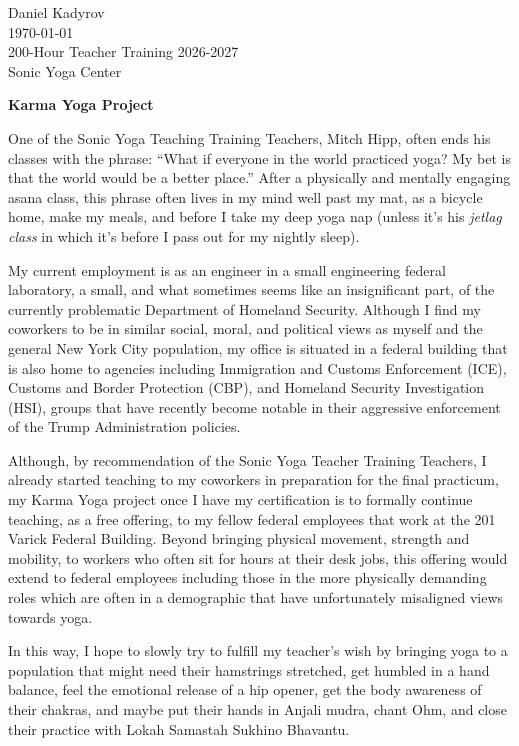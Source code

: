 \documentclass[11pt]{article}
\begin{document}
 
\noindent
Daniel Kadyrov\\
\today\\
200-Hour Teacher Training 2026-2027\\
Sonic Yoga Center
 
\vspace{1em}
 
\begin{center}
  \textbf{Karma Yoga Project}
\end{center}
 
One of the Sonic Yoga Teaching Training Teachers, Mitch Hipp, often ends his classes with the phrase: ``What if everyone in the world practiced yoga? My bet is that the world would be a better place.'' After a physically and mentally engaging asana class, this phrase often lives in my mind well past my mat, as a bicycle home, make my meals, and before I take my deep yoga nap (unless it's his \textit{jetlag class} in which it's before I pass out for my nightly sleep). 

My current employment is as an engineer in a small engineering federal laboratory, a small, and what sometimes seems like an insignificant part, of the currently problematic Department of Homeland Security. Although I find my coworkers to be in similar social, moral, and political views as myself and the general New York City population, my office is situated in a federal building that is also home to agencies including Immigration and Customs Enforcement (ICE), Customs and Border Protection (CBP), and Homeland Security Investigation (HSI), groups that have recently become notable in their aggressive enforcement of the Trump Administration policies. 

Although, by recommendation of the Sonic Yoga Teacher Training Teachers, I already started teaching to my coworkers in preparation for the final practicum, my Karma Yoga project once I have my certification is to formally continue teaching, as a free offering, to my fellow federal employees that work at the 201 Varick Federal Building. Beyond bringing physical movement, strength and mobility, to workers who often sit for hours at their desk jobs, this offering would extend to federal employees including those in the more physically demanding roles which are often in a demographic that have unfortunately misaligned views towards yoga. 

In this way, I hope to slowly try to fulfill my teacher's wish by bringing yoga to a population that might need their hamstrings stretched, get humbled in a hand balance, feel the emotional release of a hip opener, get the body awareness of their chakras, and maybe put their hands in Anjali mudra, chant Ohm, and close their practice with Lokah Samastah Sukhino Bhavantu.
\end{document}
